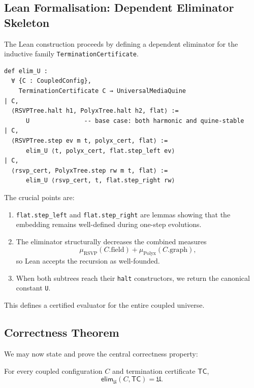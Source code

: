 \subsection{Lean Formalisation: Dependent Eliminator Skeleton}

The Lean construction proceeds by defining a dependent eliminator for the inductive family \texttt{TerminationCertificate}.

\begin{verbatim}
def elim_U :
  ∀ {C : CoupledConfig},
    TerminationCertificate C → UniversalMediaQuine
| C,
  ⟨RSVPTree.halt h1, PolyxTree.halt h2, flat⟩ :=
      U               -- base case: both harmonic and quine-stable
| C,
  ⟨RSVPTree.step ev m t, polyx_cert, flat⟩ :=
      elim_U ⟨t, polyx_cert, flat.step_left ev⟩
| C,
  ⟨rsvp_cert, PolyxTree.step rw m t, flat⟩ :=
      elim_U ⟨rsvp_cert, t, flat.step_right rw⟩
\end{verbatim}

The crucial points are:

\begin{enumerate}
\item \texttt{flat.step\_left} and \texttt{flat.step\_right} are lemmas showing that the embedding remains well-defined during one-step evolutions.
\item The eliminator structurally decreases the combined measures
\[
   \mu_{\mathrm{RSVP}}(C.\mathrm{field})
   + \mu_{\mathrm{Polyx}}(C.\mathrm{graph}),
\]
so Lean accepts the recursion as well-founded.
\item When both subtrees reach their \texttt{halt} constructors, we return the canonical constant \texttt{U}.
\end{enumerate}

This defines a certified evaluator for the entire coupled universe.

\subsection{Correctness Theorem}

We may now state and prove the central correctness property:

\begin{theorem}
For every coupled configuration $C$ and termination certificate $\mathsf{TC}$,
\[
   \mathsf{elim}_{\mathfrak{U}}(C,\mathsf{TC}) = \mathfrak{U}.
\]
\end{theorem}

